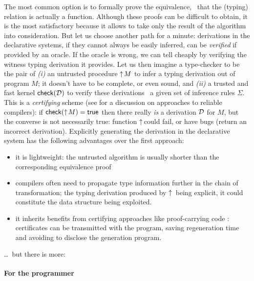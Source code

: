 \documentclass{llncs}
\begin{document}
The most common option is to formally prove the equivalence, \ie\ that
the (typing) relation is actually a function. Although these proofs
can be difficult to obtain, it is the most satisfactory because it
allows to take only the result of the algorithm into
consideration. But let us choose another path for a minute:
derivations in the declarative systems, if they cannot always be
easily inferred, can be \emph{verified} if provided by an oracle. If
the oracle is wrong, we can tell cheaply by verifying the witness
typing derivation it provides. Let us then imagine a type-checker to
be the pair of \emph{(i)} an untrusted procedure $\uparrow\!{M}$ to infer
a typing derivation out of program $M$; it doesn't have to be
complete, or even sound, and \emph{(ii)} a trusted and fast kernel
${\text{\textsf{check}}}({\mathcal D})$ to verify these derivations \wrt\ a given set of inference
rules $\Sigma$. This is a \emph{certifying} scheme (see
\cite{leroy2006compcert} for a discussion on approaches to reliable
compilers): if ${\text{\textsf{check}}}({\uparrow\!{M}}) = \text{\textsf{true}}$ then there really
\emph{is} a derivation $\mathcal D$ for $M$, but the converse is not
necessarily true: function $\uparrow\!{}\!\!$ could fail, or have bugs
(return an incorrect derivation). Explicitly generating the derivation
in the declarative system has the following advantages over the first
approach:
\begin{itemize}
\item it is lightweight: the untrusted algorithm is usually shorter
  than the corresponding equivalence proof
\item compilers often need to propagate type information further in
  the chain of transformation; the typing derivation produced by
  $\uparrow\!{}$ being explicit, it could constitute the data structure
  being exploited.
\item it inherits benefits from certifying approaches like
  proof-carrying code \cite{necula1997proof}: certificates can be
  transmitted with the program, saving regeneration time and avoiding
  to disclose the generation program.
\end{itemize}
\ldots\ but there is more:

\paragraph{For the programmer}
\end{document}
